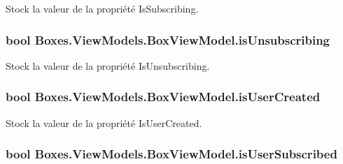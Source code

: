 Stock la valeur de la propriété {\ttfamily Is\+Subscribing}. 

\subsubsection[{\texorpdfstring{is\+Unsubscribing}{isUnsubscribing}}]{\setlength{\rightskip}{0pt plus 5cm}bool Boxes.\+View\+Models.\+Box\+View\+Model.\+is\+Unsubscribing\hspace{0.3cm}{\ttfamily [private]}}\hypertarget{class_boxes_1_1_view_models_1_1_box_view_model_a47dd859f9c78c367d7ad20cb0d64590e}{}\label{class_boxes_1_1_view_models_1_1_box_view_model_a47dd859f9c78c367d7ad20cb0d64590e}


Stock la valeur de la propriété {\ttfamily Is\+Unsubscribing}. 

\subsubsection[{\texorpdfstring{is\+User\+Created}{isUserCreated}}]{\setlength{\rightskip}{0pt plus 5cm}bool Boxes.\+View\+Models.\+Box\+View\+Model.\+is\+User\+Created\hspace{0.3cm}{\ttfamily [private]}}\hypertarget{class_boxes_1_1_view_models_1_1_box_view_model_ab2e5bb78804d47d3faf1c43996737ad5}{}\label{class_boxes_1_1_view_models_1_1_box_view_model_ab2e5bb78804d47d3faf1c43996737ad5}


Stock la valeur de la propriété {\ttfamily Is\+User\+Created}. 

\subsubsection[{\texorpdfstring{is\+User\+Subscribed}{isUserSubscribed}}]{\setlength{\rightskip}{0pt plus 5cm}bool Boxes.\+View\+Models.\+Box\+View\+Model.\+is\+User\+Subscribed\hspace{0.3cm}{\ttfamily [private]}}\hypertarget{class_boxes_1_1_view_models_1_1_box_view_model_a0700ecc606f79ce13ba0e1bb2678280a}{}\label{class_boxes_1_1_view_models_1_1_box_view_model_a0700ecc606f79ce13ba0e1bb2678280a}


